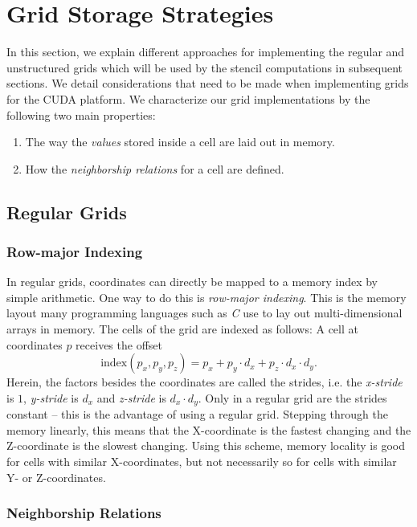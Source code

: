\section{Grid Storage Strategies}				\label{sec:grid-implementations}

In this section, we explain different approaches for implementing the regular and unstructured grids which will be used by the stencil computations in subsequent sections. We detail considerations that need to be made when implementing grids for the CUDA platform. We characterize our grid implementations by the following two main properties:
\begin{enumerate}
	\item The way the \emph{values} stored inside a cell are laid out in memory.
	\item How the \emph{neighborship relations} for a cell are defined.
\end{enumerate}

\subsection{Regular Grids}

\subsubsection{Row-major Indexing}

In regular grids, coordinates can directly be mapped to a memory index by simple arithmetic. One way to do this is \emph{row-major indexing}. This is the memory layout many programming languages such as \emph{C} use to lay out multi-dimensional arrays in memory. The cells of the grid are indexed as follows: A cell at coordinates $p$ receives the offset
 $$\text{index}\left(p_x, p_y, p_z\right) = p_x + p_y \cdot d_x + p_z \cdot d_x \cdot d_y.$$
Herein, the factors besides the coordinates are called the strides, i.e. the \emph{x-stride} is $1$, \emph{y-stride} is $d_x$ and \emph{z-stride} is $d_x\cdot d_y$. Only in a regular grid are the strides constant -- this is the advantage of using a regular grid. Stepping through the memory linearly, this means that the X-coordinate is the fastest changing and the Z-coordinate is the slowest changing. Using this scheme, memory locality is good for cells with similar X-coordinates, but not necessarily so for cells with similar Y- or Z-coordinates.

\subsubsection{Neighborship Relations}

